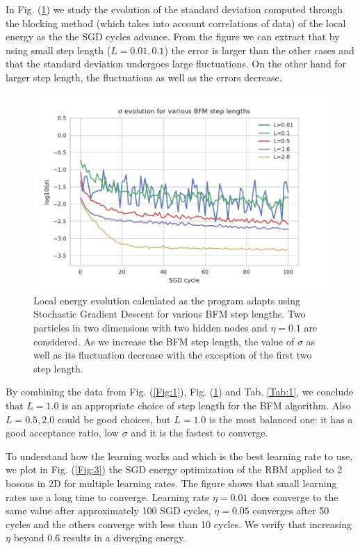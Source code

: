 In Fig. (\ref{Fig:2}) we study the evolution of the standard deviation computed through the blocking method (which takes into account correlations of data) of the local energy as the the SGD cycles advance. From the figure we can extract that by using small step length ($L=0.01,0.1$) the error is larger than the other cases and that the standard deviation undergoes large fluctuations. On the other hand for larger step length, the fluctuations as well as the errors decrease.

\begin{figure}[H]
	\centering
	\includegraphics[scale=1.00]{plot2.pdf}
	\caption{Local energy evolution calculated as the program adapts using Stochastic Gradient Descent for various BFM step lengths. Two particles in two dimensions with two hidden nodes and $\eta = 0.1$ are considered. As we increase the BFM step length, the value of $\sigma$ as well as its fluctuation decrease with the exception of the first two step length.}
	\label{Fig:2}
\end{figure} 

By combining the data from Fig. (\ref{Fig:1}), Fig. (\ref{Fig:2}) and Tab. \ref{Tab:1}, we conclude that $L = 1.0$ is an appropriate choice of step length for the BFM algorithm. Also $L=0.5,2.0$ could be good choices, but $L=1.0$ is the most balanced one: it has a good acceptance ratio, low $\sigma$ and it is the fastest to converge.

To understand how the learning works and which is the best learning rate to use, we plot in Fig. (\ref{Fig:3}) the SGD energy optimization of the RBM applied to 2 bosons in 2D for multiple learning rates. The figure shows that small learning rates use a long time to converge. Learning rate $\eta=0.01$ does converge to the same value after approximately 100 SGD cycles, $\eta=0.05$ converges after 50 cycles and the others converge with less than 10 cycles. We verify that increasing $\eta$ beyond 0.6 results in a diverging energy. 


